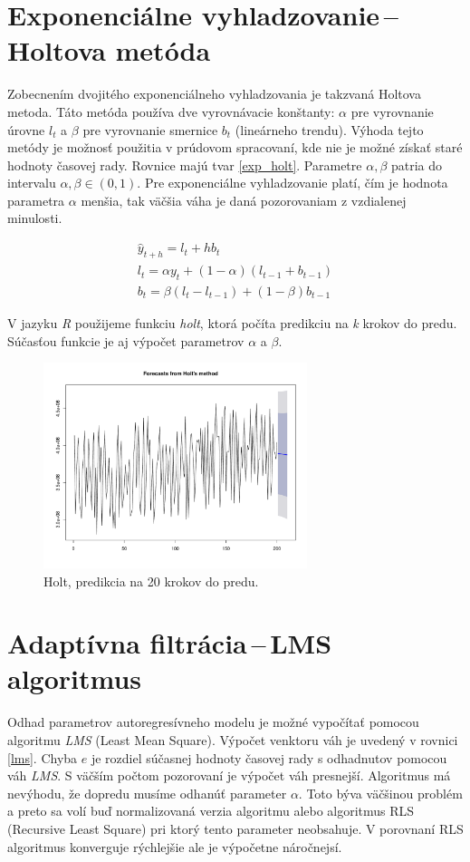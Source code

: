 \documentclass[12pt,a4paper,oneside,final]{article}
\theoremstyle{definition}
\theoremstyle{remark}
\numberwithin{equation}{section}
\begin{document}
\section{Exponenciálne vyhladzovanie\,--\,Holtova metóda}
Zobecnením dvojitého exponenciálneho vyhladzovania je takzvaná Holtova metoda.
Táto metóda používa dve vyrovnávacie konštanty: $\alpha$ pre vyrovnanie úrovne $l_t$
a $\beta$ pre vyrovnanie smernice $b_t$ (lineárneho trendu).
Výhoda tejto metódy je možnosť použitia v prúdovom spracovaní, kde nie je možné získať staré hodnoty časovej rady. 
Rovnice majú tvar \ref{exp_holt}. Parametre $\alpha, \beta$ patria do intervalu 
$\alpha,\beta \in (0,1)$. Pre exponenciálne vyhladzovanie platí, 
čím je hodnota parametra $\alpha$ menšia, tak väčšia váha je daná pozorovaniam z
vzdialenej minulosti.

\begin{eqnarray} \label{exp_holt}
    \hat{y}_{t+h} = l_{t} + hb_{t} \\
    \nonumber l_t = \alpha y_t + (1 - \alpha) (l_{t-1} + b_{t-1}) \\
    \nonumber b_t = \beta (l_t - l_{t-1}) + (1 - \beta)b_{t-1} 
\end{eqnarray}
 
V jazyku \emph{R} použijeme funkciu \emph{holt}, ktorá počíta predikciu na \emph{k} krokov 
do predu. Súčasťou funkcie je aj výpočet parametrov $\alpha$ a $\beta$.

\begin{figure}[H]
    \begin{center}
        \includegraphics[width=.8\textwidth,height=6cm]{images/heap_holt.pdf}
        \caption{Holt, predikcia na 20 krokov do predu.}
        \label{obr:heap_holt}
    \end{center}
\end{figure}

\section{Adaptívna filtrácia\,--\,LMS algoritmus}
Odhad parametrov autoregresívneho modelu je možné vypočítať 
pomocou algoritmu \emph{LMS} (Least Mean Square). Výpočet venktoru váh je uvedený v
rovnici \ref{lms}. Chyba $e$ je rozdiel súčasnej hodnoty časovej rady s odhadnutov pomocou
váh \emph{LMS}. S väčším počtom pozorovaní je výpočet váh presnejší. Algoritmus 
má nevýhodu, že dopredu musíme odhanúť parameter $\alpha$. Toto býva väčšinou problém 
a preto sa volí buď normalizovaná verzia algoritmu alebo algoritmus RLS (Recursive Least
Square) pri ktorý tento parameter neobsahuje. V porovnaní RLS algoritmus konverguje
rýchlejšie ale je výpočetne náročnejsí.  
\end{document}
